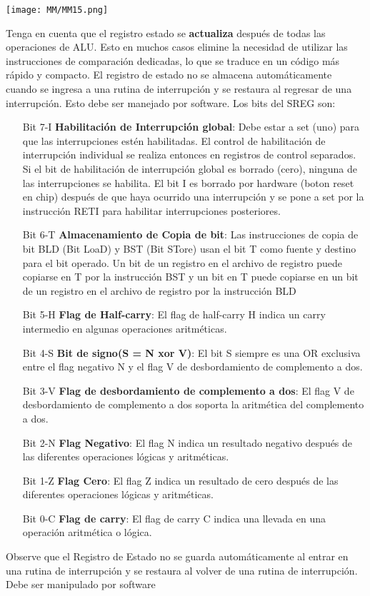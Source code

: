 \documentclass[
	12pt, %
	fleqn, %
	a4paper, %
]{LegrandOrangeBook}
\begin{document}
\begin{enumerate}
\begin{center}
\texttt{[image: MM/MM15.png]}
\end{center}
Tenga en cuenta que el registro estado se \textbf{actualiza} después de todas las operaciones de ALU. Esto en muchos casos elimine la necesidad de utilizar las instrucciones de comparación dedicadas, lo que se traduce en un código más rápido y compacto. El registro de estado no se almacena automáticamente cuando se ingresa a una rutina de interrupción y se restaura al regresar de una interrupción. Esto debe ser manejado por software. Los bits del SREG son:
\begin{enumerate}
\item[Bit 7-I] \textbf{Habilitación de Interrupción global}: Debe estar a set (uno) para que las interrupciones estén habilitadas. El control de habilitación de interrupción individual se realiza entonces en registros de control separados. Si el bit de habilitación de interrupción global es borrado (cero), ninguna de las interrupciones se habilita. El bit I es borrado por hardware (boton reset en chip) después de que haya ocurrido una interrupción y se pone a set por la instrucción RETI para habilitar interrupciones posteriores.
\item[Bit 6-T] \textbf{Almacenamiento de Copia de bit}: Las instrucciones de copia de bit BLD (Bit LoaD) y BST (Bit STore) usan el bit T como fuente y destino para el bit operado. Un bit de un registro en el archivo de registro puede copiarse en T por la instrucción BST y un bit en T puede copiarse en un bit de un registro en el archivo de registro por la instrucción BLD
\item[Bit 5-H] \textbf{Flag de Half-carry}: El flag de half-carry H indica un carry intermedio en algunas operaciones aritméticas.
\item[Bit 4-S] \textbf{Bit de signo(S = N xor V)}: El bit S siempre es una OR exclusiva entre el flag negativo N y el flag V de desbordamiento de complemento a dos.
\item[Bit 3-V] \textbf{Flag de desbordamiento de complemento a dos}: El flag V de desbordamiento de complemento a dos soporta la aritmética del complemento a dos.
\item[Bit 2-N] \textbf{Flag Negativo}: El flag N indica un resultado negativo después de las diferentes operaciones lógicas y aritméticas.
\item[Bit 1-Z] \textbf{Flag Cero}: El flag Z indica un resultado de cero después de las diferentes operaciones lógicas y aritméticas.
\item[Bit 0-C] \textbf{Flag de carry}: El flag de carry C indica una llevada en una operación aritmética o
lógica.
\end{enumerate}
Observe que el Registro de Estado no se guarda automáticamente al entrar en una rutina de interrupción y se restaura al volver de una rutina de interrupción. Debe ser manipulado por software
\end{enumerate}
\end{document}
